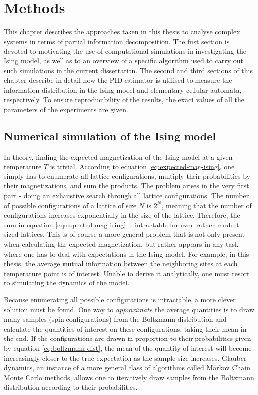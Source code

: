 \documentclass[12pt]{article}
\begin{document}
\newpage
\section{Methods}

This chapter describes the approaches taken in this thesis to analyse complex systems in terms of partial information decomposition. The first section is devoted to motivating the use of computational simulations in investigating the Ising model, as well as to an overview of a specific algorithm used to carry out such simulations in the current dissertation. The second and third sections of this chapter describe in detail how the PID estimator is utilised to measure the information distribution in the Ising model and elementary cellular automata, respectively. To ensure reproducibility of the results, the exact values of all the parameters of the experiments are given. 

\subsection{Numerical simulation of the Ising model}

In theory, finding the expected magnetization of the Ising model at a given temperature $T$ is trivial. According to equation \ref{eq:expected-mag-ising}, one simply has to enumerate all lattice configurations, multiply their probabilities by their magnetizations, and sum the products. The problem arises in the very first part - doing an exhaustive search through all lattice configurations. The number of possible configurations of a lattice of size $N$ is $2^N$, meaning that the number of configurations increases exponentially in the size of the lattice. Therefore, the sum in equation \ref{eq:expected-mag-ising} is intractable for even rather modest sized lattices. This is of course a more general problem that is not only present when calculating the expected magnetization, but rather appears in any task where one has to deal with expectations in the Ising model. For example, in this thesis, the average mutual information between the neighboring sites at each temperature point is of interest. Unable to derive it analytically, one must resort to simulating the dynamics of the model. 

Because enumerating all possible configurations is intractable, a more clever solution must be found. One way to \textit{approximate} the average quantities is to draw many samples (spin configurations) from the Boltzmann distribution and calculate the quantities of interest on these configurations, taking their mean in the end. If the configurations are drawn in proportion to their probabilities given by equation \ref{eq:boltzmann-dist}, the mean of the quantity of interest will become increasingly closer to the true expectation as the sample size increases. Glauber dynamics, an instance of a more general class of algorithms called Markov Chain Monte Carlo methods, allows one to iteratively draw samples from the Boltzmann distribution according to their probabilities.
\end{document}
